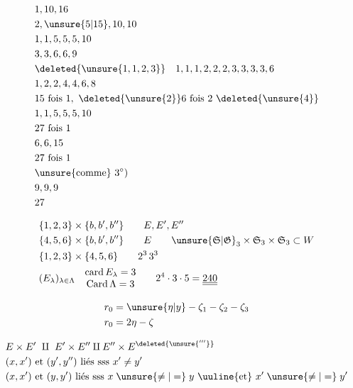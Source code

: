\[
 \begin{aligned}
 &1,10,16\\ &2,\unsure{5|15},10,10\\ &1,1,5,5,5,10\\ &3,3,6,6,9\\
 &\deleted{\unsure{1,1,2,3}}\quad1,1,1,2,2,2,3,3,3,3,6\\
 &1,2,2,4,4,6,8\\ &15\text{ fois }1,\ \deleted{\unsure{2}}6\text{ fois }2\ \deleted{\unsure{4}}\\
 &1,1,5,5,5,10\\ &27\text{ fois }1\\
 &6,6,15\\ &27\text{ fois }1\\ &\text{\unsure{comme}}~3^\circ)\\
 &9,9,9\\ &27
 \end{aligned}
\]

\[
 \begin{aligned}
 &\{1,2,3\}\times\{b,b',b''\}\qquad E,E',E''\\
 &\{4,5,6\}\times\{b,b',b''\}\qquad E\qquad
 \unsure{\mathfrak S|\mathfrak G}_3\times\mathfrak S_3\times\mathfrak S_3\subset W\\
 &\{1,2,3\}\times\{4,5,6\}\qquad 2^3\,3^3\\
 &(E_\lambda)_{\lambda\in\Lambda}\quad
 \begin{matrix}\mathrm{card}\, E_\lambda=3\\\mathrm{Card}\,\Lambda=3\end{matrix}
 \qquad 2^4\cdot3\cdot5=\underline{\underline{240}}
 \end{aligned}
\]

\[
 \begin{aligned}r_0&=\unsure{\eta|y}-\zeta_1-\zeta_2-\zeta_3\\r_0&=2\eta-\zeta\end{aligned}
\]


\[
 \begin{aligned}
 &E\times E'\ \amalg\ E'\times E''\mathbin{\amalg} E''\times E^{\deleted{\unsure{'''}}}\\
 &(x,x')\text{ et }(y',y'')\text{ liés sss } x'\ne y'\\
 &(x,x')\text{ et }(y,y')\text{ liés sss } x\mathrel{\unsure{\ne|=}}y\ \text{\uuline{et}}\ x'\mathrel{\unsure{\ne|=}}y'
 \end{aligned}
\]


